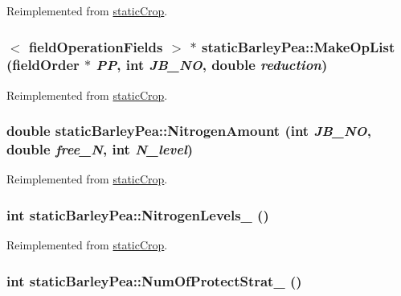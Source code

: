 Reimplemented from \hyperlink{classstatic_crop_afe0cb8a7831afa941a37338f05227d67}{staticCrop}.\hypertarget{classstatic_barley_pea_a5bdd249b2d75283a8bd007bf338525a6}{
\subsubsection[{MakeOpList}]{$<$ {\bf fieldOperationFields} $>$ $\ast$ staticBarleyPea::MakeOpList ({\bf fieldOrder} $\ast$ {\em PP}, \/  int {\em JB\_\-NO}, \/  double {\em reduction})}}
\label{classstatic_barley_pea_a5bdd249b2d75283a8bd007bf338525a6}


Reimplemented from \hyperlink{classstatic_crop_a9b67ef1ae531a3afb32b63a4aeb5916b}{staticCrop}.\hypertarget{classstatic_barley_pea_a8b1a6d68f92bbd24b79e8a3aaafc9cb1}{
\subsubsection[{NitrogenAmount}]{\setlength{\rightskip}{0pt plus 5cm}double staticBarleyPea::NitrogenAmount (int {\em JB\_\-NO}, \/  double {\em free\_\-N}, \/  int {\em N\_\-level})}}
\label{classstatic_barley_pea_a8b1a6d68f92bbd24b79e8a3aaafc9cb1}


Reimplemented from \hyperlink{classstatic_crop_af3aa85321a8a75406f8a0751b71587d0}{staticCrop}.\hypertarget{classstatic_barley_pea_a1e2e6e28ebc8e1a001aa2dfd7de96204}{
\subsubsection[{NitrogenLevels\_\-}]{\setlength{\rightskip}{0pt plus 5cm}int staticBarleyPea::NitrogenLevels\_\- ()}}
\label{classstatic_barley_pea_a1e2e6e28ebc8e1a001aa2dfd7de96204}


Reimplemented from \hyperlink{classstatic_crop_a32b69ed138beaed150efa74d18e82d8e}{staticCrop}.\hypertarget{classstatic_barley_pea_ac33dd31e35056a4816bb1bec4613550d}{
\subsubsection[{NumOfProtectStrat\_\-}]{\setlength{\rightskip}{0pt plus 5cm}int staticBarleyPea::NumOfProtectStrat\_\- ()}}
\label{classstatic_barley_pea_ac33dd31e35056a4816bb1bec4613550d}


